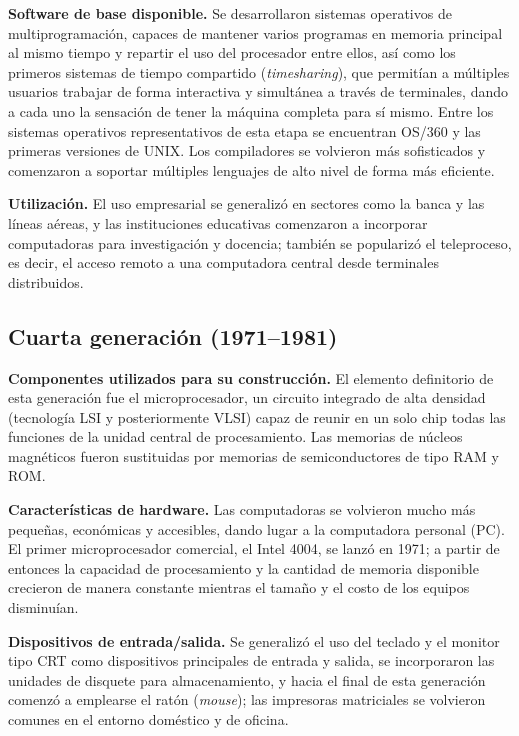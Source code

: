\documentclass[12pt,letterpaper]{article}
\begin{document}
\textbf{Software de base disponible.} Se desarrollaron sistemas operativos de multiprogramación, capaces de mantener varios programas en memoria principal al mismo tiempo y repartir el uso del procesador entre ellos, así como los primeros sistemas de tiempo compartido (\textit{timesharing}), que permitían a múltiples usuarios trabajar de forma interactiva y simultánea a través de terminales, dando a cada uno la sensación de tener la máquina completa para sí mismo. Entre los sistemas operativos representativos de esta etapa se encuentran OS/360 y las primeras versiones de UNIX. Los compiladores se volvieron más sofisticados y comenzaron a soportar múltiples lenguajes de alto nivel de forma más eficiente.

\textbf{Utilización.} El uso empresarial se generalizó en sectores como la banca y las líneas aéreas, y las instituciones educativas comenzaron a incorporar computadoras para investigación y docencia; también se popularizó el teleproceso, es decir, el acceso remoto a una computadora central desde terminales distribuidos.

\subsection{Cuarta generación (1971--1981)}

\textbf{Componentes utilizados para su construcción.} El elemento definitorio de esta generación fue el microprocesador, un circuito integrado de alta densidad (tecnología LSI y posteriormente VLSI) capaz de reunir en un solo chip todas las funciones de la unidad central de procesamiento. Las memorias de núcleos magnéticos fueron sustituidas por memorias de semiconductores de tipo RAM y ROM.

\textbf{Características de hardware.} Las computadoras se volvieron mucho más pequeñas, económicas y accesibles, dando lugar a la computadora personal (PC). El primer microprocesador comercial, el Intel 4004, se lanzó en 1971; a partir de entonces la capacidad de procesamiento y la cantidad de memoria disponible crecieron de manera constante mientras el tamaño y el costo de los equipos disminuían.

\textbf{Dispositivos de entrada/salida.} Se generalizó el uso del teclado y el monitor tipo CRT como dispositivos principales de entrada y salida, se incorporaron las unidades de disquete para almacenamiento, y hacia el final de esta generación comenzó a emplearse el ratón (\textit{mouse}); las impresoras matriciales se volvieron comunes en el entorno doméstico y de oficina.
\end{document}
